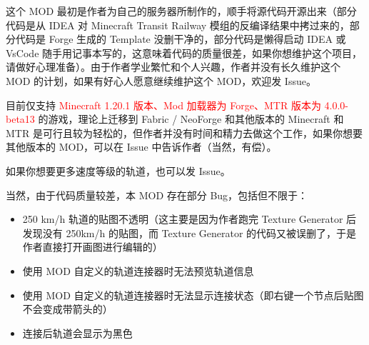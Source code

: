\documentclass{article}
\begin{document}
这个 MOD 最初是作者为自己的服务器所制作的，顺手将源代码开源出来（部分代码是从 IDEA 对 Minecraft Transit Railway 模组的反编译结果中拷过来的，部分代码是 Forge 生成的 Template 没删干净的，部分代码是懒得启动 IDEA 或 VsCode 随手用记事本写的，这意味着代码的质量很差，如果你想维护这个项目，请做好心理准备）。由于作者学业繁忙和个人兴趣，作者并没有长久维护这个 MOD 的计划，如果有好心人愿意继续维护这个 MOD，欢迎发 Issue。

目前仅支持 \textcolor{red}{Minecraft 1.20.1 版本、Mod 加载器为 Forge、MTR 版本为 4.0.0-beta13} 的游戏，理论上迁移到 Fabric / NeoForge 和其他版本的 Minecraft 和 MTR 是可行且较为轻松的，但作者并没有时间和精力去做这个工作，如果你想要其他版本的 MOD，可以在 Issue 中告诉作者（当然，有偿）。

如果你想要更多速度等级的轨道，也可以发 Issue。

当然，由于代码质量较差，本 MOD 存在部分 Bug，包括但不限于：

\begin{itemize}
    \item 250 km/h 轨道的贴图不透明（这主要是因为作者跑完 Texture Generator 后发现没有 250km/h 的贴图，而 Texture Generator 的代码又被误删了，于是作者直接打开画图进行编辑的）
    \item 使用 MOD 自定义的轨道连接器时无法预览轨道信息
    \item 使用 MOD 自定义的轨道连接器时无法显示连接状态（即右键一个节点后贴图不会变成带箭头的）
    \item 连接后轨道会显示为黑色
\end{itemize}
\end{document}
